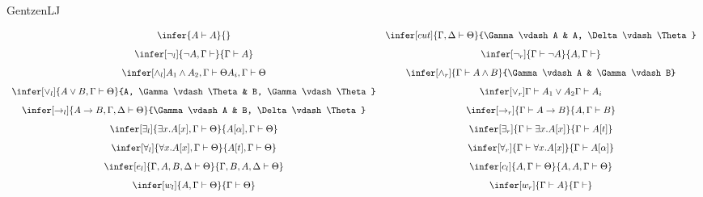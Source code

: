 \begin{entry}{GentzenLJ}  


\begin{calculus}

\[
\begin{array}{cc}
\infer{A \vdash A}{}
&
\infer[cut]{\Gamma, \Delta \vdash \Theta}{\Gamma \vdash A & A, \Delta \vdash \Theta}
\\[8pt]
\infer[\neg_l]{\neg A, \Gamma \vdash }{\Gamma \vdash A}
&
\infer[\neg_r]{\Gamma \vdash \neg A}{A, \Gamma \vdash }
\\[8pt]
\infer[\wedge_{l}]{A_1 \wedge A_2, \Gamma \vdash \Theta}{A_i, \Gamma \vdash \Theta}
&
\infer[\wedge_r]{\Gamma \vdash A \wedge B}{\Gamma \vdash A & \Gamma \vdash B}
\\[8pt]
\infer[\vee_l]{A \vee B, \Gamma \vdash \Theta}{A, \Gamma \vdash \Theta & B, \Gamma \vdash \Theta}
&
\infer[\vee_{r}]{\Gamma \vdash A_1 \vee A_2}{\Gamma \vdash A_i}
\\[8pt]
\infer[\rightarrow_l]{A \rightarrow B, \Gamma, \Delta \vdash \Theta}{\Gamma \vdash A & B, \Delta \vdash \Theta}
&
\infer[\rightarrow_r]{\Gamma \vdash A \rightarrow B}{A, \Gamma \vdash B}
\\[8pt]
\infer[\exists_l]{\exists x.A[x], \Gamma \vdash \Theta}{A[\alpha], \Gamma \vdash \Theta}
&
\infer[\exists_r]{\Gamma \vdash \exists x.A[x]}{\Gamma \vdash A[t]}
\\[8pt]
\infer[\forall_l]{\forall x.A[x], \Gamma \vdash \Theta}{A[t], \Gamma \vdash \Theta}
&
\infer[\forall_r]{\Gamma \vdash \forall x.A[x]}{\Gamma \vdash A[\alpha]}
\\[8pt]
\infer[e_l]{\Gamma, A, B, \Delta \vdash \Theta}{\Gamma, B, A, \Delta \vdash \Theta}
&
\infer[c_l]{A, \Gamma \vdash \Theta}{A, A, \Gamma \vdash \Theta}
\\[8pt]
\infer[w_l]{A, \Gamma \vdash \Theta}{\Gamma \vdash \Theta}
&
\infer[w_r]{\Gamma \vdash A}{\Gamma \vdash}
\\
\end{array}
\]
\end{calculus}



\end{entry}
